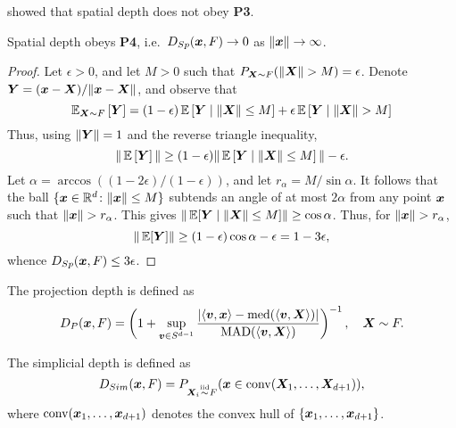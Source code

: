 \begin{remark}
    \textcite{nagy-2017} showed that spatial depth does not obey \textbf{P3}.
\end{remark}

\begin{lemma}\label{lem:spatial_vanish}
    Spatial depth obeys \textbf{P4}, i.e.\ $D_{Sp}(\bm{x}, F) \to 0$ as
    $\Vert \bm{x} \Vert \to \infty$.
\end{lemma}
\begin{proof}
    Let $\epsilon > 0$, and let $M > 0$ such that $P_{\bm{X} \sim F}(\Vert \bm{X} \Vert >
    M) = \epsilon$.
    Denote $\bm{Y} = (\bm{x} - \bm{X}) / \Vert \bm{x} - \bm{X} \Vert$, and observe that
    \begin{equation}
        \operatorname{\mathbb{E}}_{\bm{X} \sim F}\left[\bm{Y}\right]
        = (1 - \epsilon)\operatorname{\mathbb{E}}\left[\bm{Y}\mid \Vert \bm{X} \Vert \leq M\right] +
          \epsilon\operatorname{\mathbb{E}}\left[\bm{Y}\mid \Vert \bm{X} \Vert > M\right]
    \end{equation}
    Thus, using $\Vert \bm{Y} \Vert = 1$ and the reverse triangle inequality,
    \begin{equation}
        \Vert \operatorname{\mathbb{E}}\left[\bm{Y}\right] \Vert
        \geq (1 - \epsilon)\Vert \operatorname{\mathbb{E}}\left[\bm{Y}\mid \Vert \bm{X} \Vert \leq M\right] \Vert - \epsilon.
    \end{equation}
    Let $\alpha = \arccos((1 - 2\epsilon)/(1 - \epsilon))$, and let $r_\alpha =
    M/\sin\alpha$.
    It follows that the ball $\{\bm{x} \in \mathbb{R}^d\colon \Vert \bm{x} \Vert \leq M\}$
    subtends an angle of at most $2\alpha$ from any point $\bm{x}$ such that
    $\Vert \bm{x} \Vert > r_\alpha$.
    This gives $\Vert \operatorname{\mathbb{E}}[\bm{Y} \mid \Vert \bm{X} \Vert \leq M] \Vert \geq \cos\alpha$.
    Thus, for $\Vert \bm{x} \Vert > r_\alpha$,
    \begin{equation}
        \Vert \operatorname{\mathbb{E}}[\bm{Y}] \Vert \geq (1 - \epsilon)\cos\alpha - \epsilon = 1 - 3\epsilon,
    \end{equation}
    whence $D_{Sp}(\bm{x}, F) \leq 3\epsilon$.
\end{proof}



\begin{definition}
    The projection depth is defined as
    \begin{equation}
        D_P(\bm{x}, F) = \left(1 + \sup_{\bm{v} \in S^{d - 1}} \frac{|\langle \bm{v}, \bm{x} \rangle - \operatorname{med}(\langle \bm{v}, \bm{X} \rangle)|}{\operatorname{MAD}(\langle \bm{v}, \bm{X} \rangle)}\right)^{-1}, \quad
        \bm{X} \sim F.
    \end{equation}
\end{definition}

\begin{definition}
    The simplicial depth is defined as
    \begin{equation}
        D_{Sim}(\bm{x}, F) = P_{\bm{X}_i \overset{\text{iid}}{\sim} F}(\bm{x} \in \operatorname{conv}(\bm{X}_1, \dots, \bm{X}_{d + 1})),
    \end{equation}
    where $\operatorname{conv}(\bm{x}_1, \dots, \bm{x}_{d + 1})$ denotes the convex hull of $\{\bm{x}_1, \dots, \bm{x}_{d + 1}\}$.
\end{definition}

